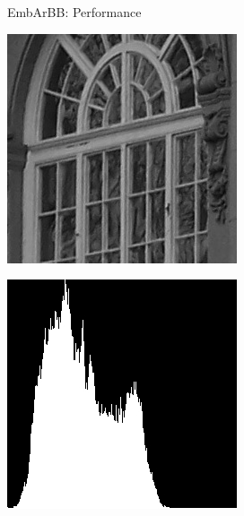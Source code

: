 \documentclass[xcolor=dvipsnames]{beamer}
\begin{document}
\begin{frame}{EmbArBB: Performance} 

 \begin{minipage}{.48\linewidth}
 \includegraphics[width=\linewidth]{window.jpg}
 \end{minipage} %
 \begin{minipage}{.48\linewidth}
 \includegraphics[width=\linewidth]{histogram.jpg}
 \end{minipage}

\end{frame} 
\end{document}
